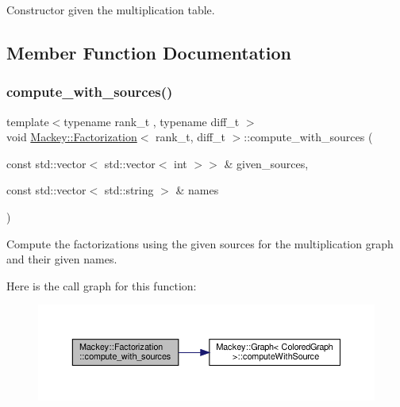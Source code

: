 Constructor given the multiplication table. 



\subsection{Member Function Documentation}
\mbox{\label{classMackey_1_1Factorization_a2e135a37687fc3d69cd16a8729dd19eb}} 
\subsubsection{\texorpdfstring{compute\+\_\+with\+\_\+sources()}{compute\_with\_sources()}}
{\footnotesize\ttfamily template$<$typename rank\+\_\+t , typename diff\+\_\+t $>$ \\
void \hyperlink{classMackey_1_1Factorization}{Mackey\+::\+Factorization}$<$ rank\+\_\+t, diff\+\_\+t $>$\+::compute\+\_\+with\+\_\+sources (\begin{DoxyParamCaption}\item[{const std\+::vector$<$ std\+::vector$<$ int $>$$>$ \&}]{given\+\_\+sources,  }\item[{const std\+::vector$<$ std\+::string $>$ \&}]{names }\end{DoxyParamCaption})}



Compute the factorizations using the given sources for the multiplication graph and their given names. 

Here is the call graph for this function\+:\nopagebreak
\begin{figure}[H]
\begin{center}
\leavevmode
\includegraphics[width=350pt]{classMackey_1_1Factorization_a2e135a37687fc3d69cd16a8729dd19eb_cgraph}
\end{center}
\end{figure}
\mbox{\label{classMackey_1_1Factorization_ac5088227511baaaec1f62802b75d3a9e}} 
